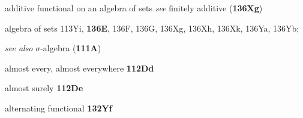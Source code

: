 











































additive functional on an algebra of sets {\it see} finitely additive
({\bf 136Xg})
































algebra of sets 113Yi, {\bf 136E}, 136F, 136G, 136Xg, 136Xh,
136Xk, 136Ya, 136Yb;  

  {\it see also }
$\sigma$-algebra ({\bf 111A})













almost every, almost everywhere {\bf 112Dd}








almost surely {\bf 112De}

alternating functional {\bf 132Yf}

















